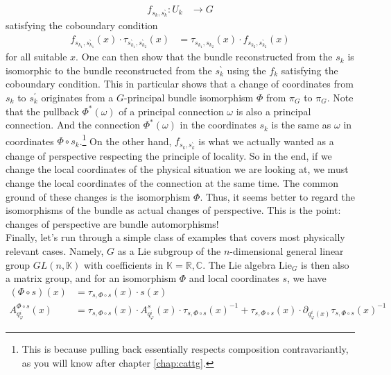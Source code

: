\begin{enumerate}
\begin{align*}
  f_{s_{k},s_{k}^{\backprime}}
  \colon
  U_{k}
  &\rightarrow
  G
\end{align*}
satisfying the coboundary condition
\begin{align*}
  f_{s_{k_{1}},s_{k_{1}}^{\backprime}}(x)
  \cdot
  \tau_{s_{k_{1}}^{\backprime},s_{k_{2}}^{\backprime}}(x)
  &=
  \tau_{s_{k_{1}},s_{k_{2}}}(x)
  \cdot
  f_{s_{k_{2}},s_{k_{2}}^{\backprime}}(x)
\end{align*}
for all suitable $x$.
One can then show that the bundle reconstructed from the $s_{k}$ is isomorphic to the bundle reconstructed from the $s_{k}^{\backprime}$ using the $f_{k}$ satisfying the coboundary condition.
This in particular shows that a change of coordinates from $s_{k}$ to $s_{k}^{\prime}$ originates from a $G$-principal bundle isomorphism $\Phi$ from $\pi_{G}$ to $\pi_{G}$.
Note that the pullback $\Phi^{\ast}(\omega)$ of a principal connection $\omega$ is also a principal connection.
And the connection $\Phi^{\ast}(\omega)$ in the coordinates $s_{k}$ is the same as $\omega$ in coordinates $\Phi \circ s_{k}$.\footnote{This is because pulling back essentially respects composition contravariantly, as you will know after chapter \ref{chap:cattg}.} On the other hand, $f_{s_{k},s_{k}^{\backprime}}$ is what we actually wanted as a change of perspective respecting the principle of locality.
So in the end, if we change the local coordinates of the physical situation we are looking at, we must change the local coordinates of the connection at the same time.
The common ground of these changes is the isomorphism $\Phi$.
Thus, it seems better to regard the isomorphisms of the bundle as actual changes of perspective.
This is the point: changes of perspective are bundle automorphisms!
\\
Finally, let's run through a simple class of examples that covers most physically relevant cases.
Namely, $G$ as a Lie subgroup of the $n$-dimensional general linear group $GL(n,\mathbb{K})$ with coefficients in $\mathbb{K} = \mathbb{R},\mathbb{C}$.
The Lie algebra $\mathrm{Lie}_{G}$ is then also a matrix group, and for an isomorphism $\Phi$ and local coordinates $s$, we have
\begin{align*}
  (\Phi \circ s)(x)
  &=
  \tau_{s,\Phi \circ s}(x)
  \cdot
  s(x)
  \\
  A_{q_{\varphi}^{i}}^{\Phi \circ s}(x)
  &=
  \tau_{s,\Phi \circ s}(x)
  \cdot
  A_{q_{\varphi}^{i}}^{s}(x)
  \cdot
  \tau_{s,\Phi \circ s}(x)^{-1}
  +
  \tau_{s,\Phi \circ s}(x)
  \cdot
  \partial_{q_{\varphi}^{i}(x)}
  \tau_{s,\Phi \circ s}(x)^{-1}

\end{align*}
\end{enumerate}
